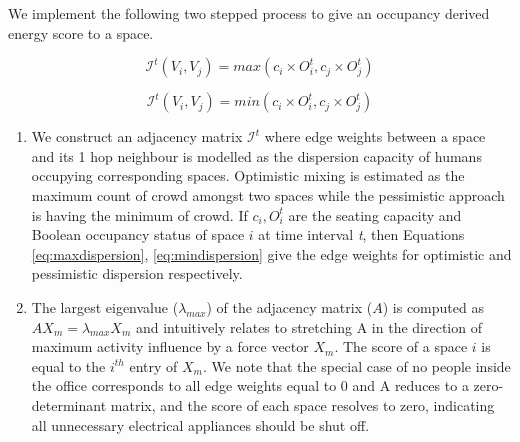 \documentclass[conference]{IEEEtran}
\begin{document}
We implement the following two stepped process to give an occupancy derived energy score to a space.  

\begin{equation}
    \mathcal{I}^t(V_i,V_j) = max( c_i  \times O_i^t, c_j  \times O_j^t  )
    \label{eq:maxdispersion}
\end{equation}

\begin{equation}
    \mathcal{I}^t(V_i,V_j) = min( c_i  \times O_i^t, c_j  \times O_j^t  )
    \label{eq:mindispersion}
\end{equation}

\begin{enumerate}
\item  We construct an adjacency matrix $\mathcal{I}^t$ where edge weights between a space and its 1 hop neighbour is modelled as the dispersion capacity of humans occupying corresponding spaces. Optimistic mixing is estimated as the maximum count of crowd amongst two spaces while the pessimistic approach is having the minimum of crowd.  If $c_i, O_i^t$ are the seating capacity and Boolean occupancy status of space $i$ at time interval \textit{t}, then Equations \ref{eq:maxdispersion}, \ref{eq:mindispersion} give the edge weights for optimistic and pessimistic dispersion respectively. 

\item  The largest eigenvalue ($\lambda_{max}$) of the adjacency matrix ($A$) is computed as $A X_{m} = \lambda_{max} X_m$  \cite{cvetkovic1990largest} and intuitively relates to stretching A in the direction of maximum activity influence by a force vector $X_m$. The score of a space $i$ is equal to the $i^{th}$ entry of $X_m$. We note that the special case of no people inside the office corresponds to all edge weights equal to 0 and A reduces to a zero-determinant matrix, and the score of each space resolves to zero, indicating all unnecessary electrical appliances should be shut off.   
\end{enumerate}
\end{document}

